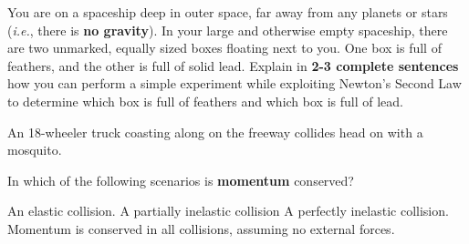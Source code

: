 \begin{questions}

\question[3] You are on a spaceship deep in outer space, far away from any planets or stars (\textit{i.e.}, there is \textbf{no gravity}). In your large and otherwise empty spaceship, there are two unmarked, equally sized boxes floating next to you. One box is full of feathers, and the other is full of solid lead. Explain in \textbf{2-3 complete sentences} how you can perform a simple experiment while exploiting Newton's Second Law to determine which box is full of feathers and which box is full of lead. 

\qspppp
\qsp


\question[2] An 18-wheeler truck coasting along on the freeway collides head on with a mosquito. 

\qspppp



\qsp

\newpage
{}

\question[1] In which of the following scenarios is \textbf{momentum} conserved?
\begin{choices}
\choice An elastic collision.
\choice A partially inelastic collision
\choice A perfectly inelastic collision. 
\choice Momentum is conserved in all collisions, assuming no external forces.
\end{choices}


\end{questions}

